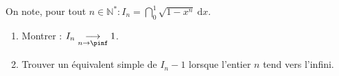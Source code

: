 
On note, pour tout $n \in \mathbb{N}^{*}: I_{n}=\dint_{0}^{1} \sqrt{1-x^{n}} \mathrm{~d} x$.

\begin{enumerate}
\item Montrer : $I_{n} \underset{n\to\pinf}{\longrightarrow} 1$.
\item Trouver un équivalent simple de $I_{n}-1$ lorsque l'entier $n$ tend vers l'infini.
\end{enumerate}

